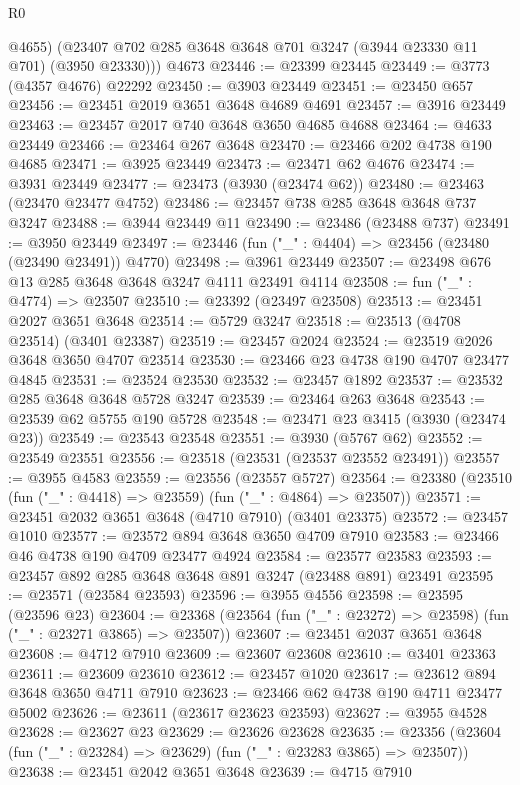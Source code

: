 \begin{lexlean}{R0}
\begin{coremodule}
        @4655)
      (@23407 @702 @285 @3648 @3648 @701 @3247 (@3944 @23330 @11 @701) (@3950 @23330)))
    @4673
@23446 := @23399 @23445
@23449 := @3773 (@4357 @4676) @22292
@23450 := @3903 @23449
@23451 := @23450 @657
@23456 := @23451 @2019 @3651 @3648 @4689 @4691
@23457 := @3916 @23449
@23463 := @23457 @2017 @740 @3648 @3650 @4685 @4688
@23464 := @4633 @23449
@23466 := @23464 @267 @3648
@23470 := @23466 @202 @4738 @190 @4685
@23471 := @3925 @23449
@23473 := @23471 @62 @4676
@23474 := @3931 @23449
@23477 := @23473 (@3930 (@23474 @62))
@23480 := @23463 (@23470 @23477 @4752)
@23486 := @23457 @738 @285 @3648 @3648 @737 @3247
@23488 := @3944 @23449 @11
@23490 := @23486 (@23488 @737)
@23491 := @3950 @23449
@23497 := @23446 (fun ("_" : @4404) => @23456 (@23480 (@23490 @23491)) @4770)
@23498 := @3961 @23449
@23507 := @23498 @676 @13 @285 @3648 @3648 @3247 @4111 @23491 @4114
@23508 := fun ("_" : @4774) => @23507
@23510 := @23392 (@23497 @23508)
@23513 := @23451 @2027 @3651 @3648
@23514 := @5729 @3247
@23518 := @23513 (@4708 @23514) (@3401 @23387)
@23519 := @23457 @2024
@23524 := @23519 @2026 @3648 @3650 @4707 @23514
@23530 := @23466 @23 @4738 @190 @4707 @23477 @4845
@23531 := @23524 @23530
@23532 := @23457 @1892
@23537 := @23532 @285 @3648 @3648 @5728 @3247
@23539 := @23464 @263 @3648
@23543 := @23539 @62 @5755 @190 @5728
@23548 := @23471 @23 @3415 (@3930 (@23474 @23))
@23549 := @23543 @23548
@23551 := @3930 (@5767 @62)
@23552 := @23549 @23551
@23556 := @23518 (@23531 (@23537 @23552 @23491))
@23557 := @3955 @4583
@23559 := @23556 (@23557 @5727)
@23564 := @23380 (@23510 (fun ("_" : @4418) => @23559) (fun ("_" : @4864) => @23507))
@23571 := @23451 @2032 @3651 @3648 (@4710 @7910) (@3401 @23375)
@23572 := @23457 @1010
@23577 := @23572 @894 @3648 @3650 @4709 @7910
@23583 := @23466 @46 @4738 @190 @4709 @23477 @4924
@23584 := @23577 @23583
@23593 := @23457 @892 @285 @3648 @3648 @891 @3247 (@23488 @891) @23491
@23595 := @23571 (@23584 @23593)
@23596 := @3955 @4556
@23598 := @23595 (@23596 @23)
@23604 := @23368 (@23564 (fun ("_" : @23272) => @23598) (fun ("_" : @23271 @3865) => @23507))
@23607 := @23451 @2037 @3651 @3648
@23608 := @4712 @7910
@23609 := @23607 @23608
@23610 := @3401 @23363
@23611 := @23609 @23610
@23612 := @23457 @1020
@23617 := @23612 @894 @3648 @3650 @4711 @7910
@23623 := @23466 @62 @4738 @190 @4711 @23477 @5002
@23626 := @23611 (@23617 @23623 @23593)
@23627 := @3955 @4528
@23628 := @23627 @23
@23629 := @23626 @23628
@23635 := @23356 (@23604 (fun ("_" : @23284) => @23629) (fun ("_" : @23283 @3865) => @23507))
@23638 := @23451 @2042 @3651 @3648
@23639 := @4715 @7910

\end{coremodule}
\end{lexlean}
